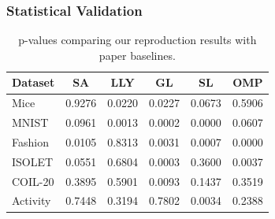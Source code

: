 \documentclass[a4paper,twocolumn]{article} %
\begin{document}
\subsubsection{Statistical Validation}
\begin{table}[ht]
\centering
\scriptsize
\begin{tabular}{lccccc}
\hline
\textbf{Dataset} & \textbf{SA} & \textbf{LLY} & \textbf{GL} & \textbf{SL} & \textbf{OMP} \\
\hline
Mice     & 0.9276 & 0.0220 & 0.0227 & 0.0673 & 0.5906 \\
MNIST    & 0.0961 & 0.0013 & 0.0002 & 0.0000 & 0.0607 \\
Fashion  & 0.0105 & 0.8313 & 0.0031 & 0.0007 & 0.0000 \\
ISOLET   & 0.0551 & 0.6804 & 0.0003 & 0.3600 & 0.0037 \\
COIL-20  & 0.3895 & 0.5901 & 0.0093 & 0.1437 & 0.3519 \\
Activity & 0.7448 & 0.3194 & 0.7802 & 0.0034 & 0.2388 \\
\hline
\end{tabular}
\caption{p-values comparing our reproduction results with paper baselines.}
\label{tab:pvalue-comparison}
\end{table}
\end{document}
